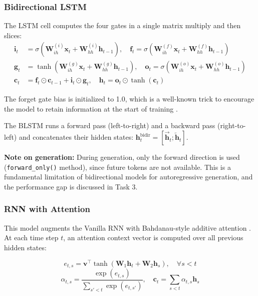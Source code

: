 \documentclass[11pt, a4paper]{article}
\begin{document}
\subsubsection{Bidirectional LSTM}

The LSTM cell computes the four gates in a single matrix multiply and then slices:
\begin{align}
\mathbf{i}_t &= \sigma(\mathbf{W}_{ih}^{(i)}\mathbf{x}_t + \mathbf{W}_{hh}^{(i)}\mathbf{h}_{t-1}), \quad
\mathbf{f}_t = \sigma(\mathbf{W}_{ih}^{(f)}\mathbf{x}_t + \mathbf{W}_{hh}^{(f)}\mathbf{h}_{t-1}) \\
\mathbf{g}_t &= \tanh(\mathbf{W}_{ih}^{(g)}\mathbf{x}_t + \mathbf{W}_{hh}^{(g)}\mathbf{h}_{t-1}), \quad
\mathbf{o}_t = \sigma(\mathbf{W}_{ih}^{(o)}\mathbf{x}_t + \mathbf{W}_{hh}^{(o)}\mathbf{h}_{t-1}) \\
\mathbf{c}_t &= \mathbf{f}_t \odot \mathbf{c}_{t-1} + \mathbf{i}_t \odot \mathbf{g}_t, \quad
\mathbf{h}_t = \mathbf{o}_t \odot \tanh(\mathbf{c}_t)
\end{align}

The forget gate bias is initialized to 1.0, which is a well-known trick to encourage the model to retain information at the start of training \cite{jozefowicz2015empirical}.

The BLSTM runs a forward pass (left-to-right) and a backward pass (right-to-left) and concatenates their hidden states: $\mathbf{h}_t^{\text{bidir}} = [\overrightarrow{\mathbf{h}}_t; \overleftarrow{\mathbf{h}}_t]$.

\textbf{Note on generation:} During generation, only the forward direction is used (\texttt{forward\_only()} method), since future tokens are not available. This is a fundamental limitation of bidirectional models for autoregressive generation, and the performance gap is discussed in Task 3.

\subsubsection{RNN with Attention}

This model augments the Vanilla RNN with Bahdanau-style additive attention \cite{bahdanau2015neural}. At each time step $t$, an attention context vector is computed over all previous hidden states:

\begin{equation}
e_{t,s} = \mathbf{v}^\top \tanh\left(\mathbf{W}_1 \mathbf{h}_t + \mathbf{W}_2 \mathbf{h}_s\right), \quad \forall s < t
\end{equation}
\begin{equation}
\alpha_{t,s} = \frac{\exp(e_{t,s})}{\sum_{s'<t} \exp(e_{t,s'})}, \quad \mathbf{c}_t = \sum_{s<t} \alpha_{t,s} \mathbf{h}_s
\end{equation}
\end{document}
